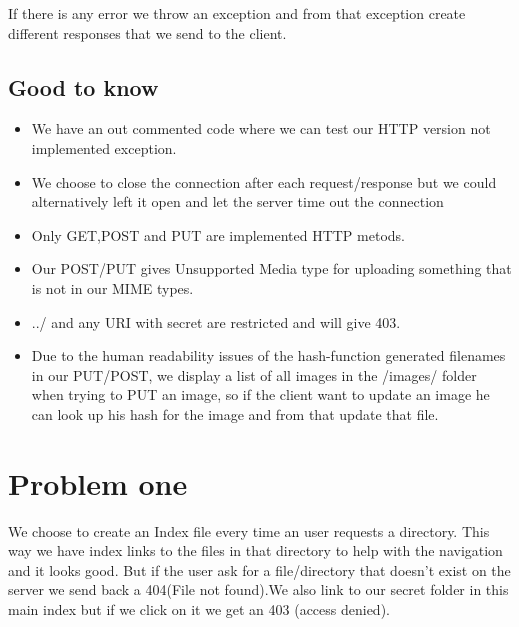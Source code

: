 \documentclass[a4paper,12pt]{article}
\numberwithin{figure}{section}
\begin{document}
If there is any error we throw an exception and from that exception create different responses that we send to the client. 


\subsection{Good to know}
\begin{itemize}
	\item We have an out commented code where we can test our HTTP version not implemented exception. 
	
	\item We choose to close the connection after each request/response but we could alternatively left it open and let the server time out the connection
	
	\item Only GET,POST and PUT are implemented HTTP metods.
	
	\item Our POST/PUT gives Unsupported Media type for uploading something that is not in our MIME types.
	
	\item ../ and any URI with secret are restricted and will give 403.
	
	\item Due to the human readability issues of the hash-function generated filenames in our PUT/POST, we display a list of all images in the /images/ folder when trying to PUT an image, so if the client want to update an image he can look up his hash for the image and from that update that file.
\end{itemize}

\newpage

\section{Problem one}

We choose to create an Index file every time an user requests a directory. This way we have index links to the files in that directory to help with the navigation and it looks good. But if the user ask for a file/directory that doesn't exist on the server we send back a 404(File not found).We also link to our secret folder in this main index but if we click on it we get an 403 (access denied).
 
\end{document}
